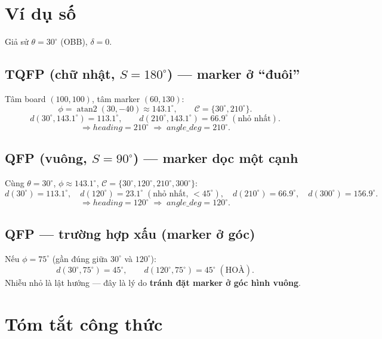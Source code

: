 \documentclass[12pt,a4paper]{article}
\newcommand{\atantwo}{\operatorname{atan2}}
\begin{document}
\section{Ví dụ số}

Giả sử $\theta = 30^\circ$ (OBB), $\delta = 0$.

\subsection{TQFP (chữ nhật, $S=180^\circ$) --- marker ở ``đuôi''}
Tâm board $(100,100)$, tâm marker $(60,130)$:
\[
\phi = \atantwo(30, -40) \approx 143.1^\circ,
\qquad \mathcal{C} = \{30^\circ, 210^\circ\}.
\]
\[
d(30^\circ, 143.1^\circ) = 113.1^\circ, \qquad
d(210^\circ, 143.1^\circ) = 66.9^\circ \;(\text{nhỏ nhất}).
\]
\[
\Rightarrow heading = 210^\circ \;\Rightarrow\; angle\_deg = 210^\circ.
\]

\subsection{QFP (vuông, $S=90^\circ$) --- marker dọc một cạnh}
Cùng $\theta=30^\circ$, $\phi \approx 143.1^\circ$, $\mathcal{C} = \{30^\circ,120^\circ,210^\circ,300^\circ\}$:
\[
d(30^\circ)=113.1^\circ,\quad
d(120^\circ)=23.1^\circ\;(\text{nhỏ nhất},\,<45^\circ),\quad
d(210^\circ)=66.9^\circ,\quad
d(300^\circ)=156.9^\circ.
\]
\[
\Rightarrow heading = 120^\circ \;\Rightarrow\; angle\_deg = 120^\circ.
\]

\subsection{QFP --- trường hợp xấu (marker ở góc)}
Nếu $\phi = 75^\circ$ (gần đúng giữa $30^\circ$ và $120^\circ$):
\[
d(30^\circ,75^\circ) = 45^\circ, \qquad d(120^\circ,75^\circ) = 45^\circ \;(\text{HOÀ}).
\]
Nhiễu nhỏ là lật hướng --- đây là lý do \textbf{tránh đặt marker ở góc hình vuông}.

\section{Tóm tắt công thức}
\end{document}
